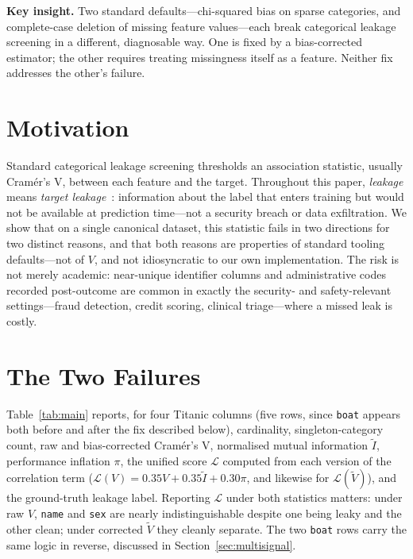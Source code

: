 \documentclass[sigconf,anonymous=false]{acmart}
\begin{document}
\maketitle

\begin{mdframed}[style=keyinsight]
\textbf{Key insight.} Two standard defaults---chi-squared bias on sparse
categories, and complete-case deletion of missing feature values---each
break categorical leakage screening in a different, diagnosable way. One is
fixed by a bias-corrected estimator; the other requires treating
missingness itself as a feature. Neither fix addresses the other's failure.
\end{mdframed}

\section{Motivation}

Standard categorical leakage screening thresholds an association statistic,
usually Cram\'er's V, between each feature and the target. Throughout this
paper, \emph{leakage} means \emph{target
leakage}~\cite{kaufman2012leakage}: information about the label that
enters training but would not be available at prediction time---not a
security breach or data exfiltration. We show that on a single canonical
dataset, this statistic fails in two directions for two distinct reasons,
and that both reasons are properties of standard tooling defaults---not of
$V$, and not idiosyncratic to our own implementation. The risk is not
merely academic: near-unique identifier columns and administrative codes
recorded post-outcome are common in exactly the security- and
safety-relevant settings---fraud detection, credit scoring, clinical
triage---where a missed leak is costly.

\section{The Two Failures}
\label{sec:failures}

Table~\ref{tab:main} reports, for four Titanic columns (five rows, since
\texttt{boat} appears both before and after the fix described below),
cardinality, singleton-category count, raw and bias-corrected Cram\'er's
V, normalised mutual information $\widetilde{I}$, performance inflation
$\pi$, the unified score $\mathcal{L}$ computed from each version of the
correlation term ($\mathcal{L}(V) = 0.35V + 0.35\widetilde{I} + 0.30\pi$,
and likewise for $\mathcal{L}(\widetilde{V})$), and the ground-truth
leakage label. Reporting $\mathcal{L}$ under both statistics matters:
under raw $V$, \texttt{name} and \texttt{sex} are nearly indistinguishable
despite one being leaky and the other clean; under corrected
$\widetilde{V}$ they cleanly separate. The two \texttt{boat} rows carry
the same logic in reverse, discussed in Section~\ref{sec:multisignal}.
\end{document}
